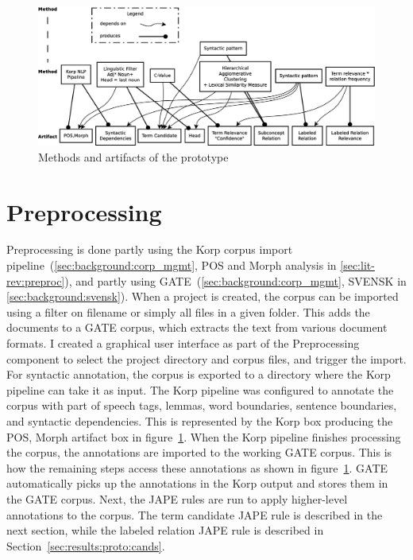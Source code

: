 \documentclass[a4paper]{report}
\begin{document}
\begin{figure}
  \includegraphics[width=\textwidth]{graphics/method-element-dependencies.eps}
  \caption{Methods and artifacts of the prototype}
  \label{fig:method-artifact}
\end{figure}

\section{Preprocessing}
\label{sec:results:proto:prepr}
Preprocessing is done partly using the Korp corpus import pipeline~(\ref{sec:background:corp_mgmt}, POS and Morph analysis in \ref{sec:lit-rev:preproc}), and partly using GATE~(\ref{sec:background:corp_mgmt}, SVENSK in \ref{sec:background:svensk}).
When a project is created, the corpus can be imported using a filter on filename or simply all files in a given folder.
This adds the documents to a GATE corpus, which extracts the text from various document formats.
I created a graphical user interface as part of the Preprocessing component to select the project directory and corpus files, and trigger the import.
For syntactic annotation, the corpus is exported to a directory where the Korp pipeline can take it as input.
The Korp pipeline was configured to annotate the corpus with part of speech tags, lemmas, word boundaries, sentence boundaries, and syntactic dependencies.
This is represented by the Korp box producing the POS, Morph artifact box in figure~\ref{fig:method-artifact}.
When the Korp pipeline finishes processing the corpus, the annotations are imported to the working GATE corpus.
This is how the remaining steps access these annotations as shown in figure~\ref{fig:method-artifact}.
GATE automatically picks up the annotations in the Korp output and stores them in the GATE corpus.
Next, the JAPE rules are run to apply higher-level annotations to the corpus.
The term candidate JAPE rule is described in the next section, while the labeled relation JAPE rule is described in Section~\ref{sec:results:proto:cands}.
\end{document}
